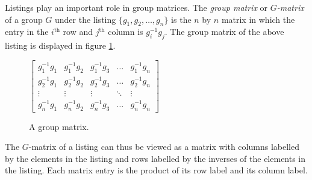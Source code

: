 Listings play an important role in group matrices.
The \emph{group matrix} or \emph{$G$-matrix} of a group $G$ under the listing $\{g_1,g_2,\ldots,g_n\}$ is the $n$ by $n$ matrix in which the entry in the $i^{\textrm{th}}$ row and $j^{\textrm{th}}$ column is $g_i^{-1} g_j$.
The group matrix of the above listing is displayed in figure \ref{fig:groupmatrix}.
\begin{figure}[htbp]
\begin{center}		
$\left[\begin{array}{lllll}
{g_1^{-1}g_1} & {g_1^{-1}g_2} & {g_1^{-1}g_3} 
 &  \ldots & {g_1^{-1}g_n} \\

{g_2^{-1}g_1} & {g_2^{-1}g_2} & {g_2^{-1}g_3} 
 &  \ldots & {g_2^{-1}g_n} \\ 

\vdots & \vdots & \vdots &\ddots &\vdots \\

{g_n^{-1}g_1} & {g_n^{-1}g_2} &{g_n^{-1}g_3} 
 &  \ldots & {g_n^{-1}g_n} 
\end{array}\right]$
\caption{A group matrix.}
\label{fig:groupmatrix}
\end{center}
\end{figure}
The $G$-matrix of a listing can thus be viewed as a matrix with columns labelled by the elements in the listing and rows labelled by the inverses of the elements in the listing.
Each matrix entry is the product of its row label and its column label.

